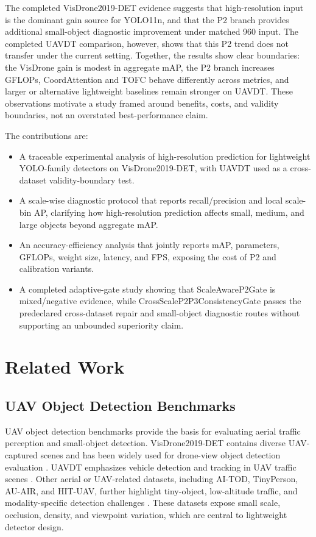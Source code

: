 \documentclass[journal]{IEEEtran}
\begin{document}
The completed VisDrone2019-DET evidence suggests that high-resolution input is the dominant gain source for YOLO11n, and that the P2 branch provides additional small-object diagnostic improvement under matched 960 input. The completed UAVDT comparison, however, shows that this P2 trend does not transfer under the current setting. Together, the results show clear boundaries: the VisDrone gain is modest in aggregate mAP, the P2 branch increases GFLOPs, CoordAttention and TOFC behave differently across metrics, and larger or alternative lightweight baselines remain stronger on UAVDT. These observations motivate a study framed around benefits, costs, and validity boundaries, not an overstated best-performance claim.

The contributions are:

\begin{itemize}
  \item A traceable experimental analysis of high-resolution prediction for lightweight YOLO-family detectors on VisDrone2019-DET, with UAVDT used as a cross-dataset validity-boundary test.
  \item A scale-wise diagnostic protocol that reports recall/precision and local scale-bin AP, clarifying how high-resolution prediction affects small, medium, and large objects beyond aggregate mAP.
  \item An accuracy-efficiency analysis that jointly reports mAP, parameters, GFLOPs, weight size, latency, and FPS, exposing the cost of P2 and calibration variants.
  \item A completed adaptive-gate study showing that ScaleAwareP2Gate is mixed/negative evidence, while CrossScaleP2P3ConsistencyGate passes the predeclared cross-dataset repair and small-object diagnostic routes without supporting an unbounded superiority claim.
\end{itemize}

\section{Related Work}

\subsection{UAV Object Detection Benchmarks}

UAV object detection benchmarks provide the basis for evaluating aerial traffic perception and small-object detection. VisDrone2019-DET contains diverse UAV-captured scenes and has been widely used for drone-view object detection evaluation \cite{du2019visdrone_det}. UAVDT emphasizes vehicle detection and tracking in UAV traffic scenes \cite{du2018uavdt}. Other aerial or UAV-related datasets, including AI-TOD, TinyPerson, AU-AIR, and HIT-UAV, further highlight tiny-object, low-altitude traffic, and modality-specific detection challenges \cite{wang2021aitod,xu2022aitodv2_nwd,yu2020tinyperson,bozcan2020auair,suo2023hituav}. These datasets expose small scale, occlusion, density, and viewpoint variation, which are central to lightweight detector design.
\end{document}
